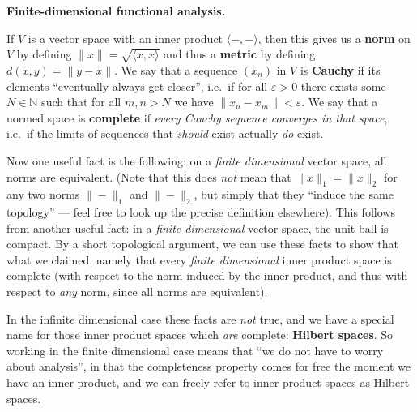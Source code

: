 \documentclass[fleqn,a4paper]{article}
\newenvironment{technical}[1]{\textbf{#1.}\par\vspace{.5\baselineskip}\everypar{\setlength{\parindent}{1.5em}}}{}
\theoremstyle{definition}
\theoremstyle{definition}
\theoremstyle{definition}
\theoremstyle{definition}
\theoremstyle{remark}
\begin{document}
\begin{technical}{Finite-dimensional functional analysis}
If \(V\) is a vector space with an inner product \(\langle-,-\rangle\), then this gives us a \textbf{norm} on \(V\) by defining \(\|x\|=\sqrt{\langle x,x\rangle}\) and thus a \textbf{metric} by defining \(d(x,y)=\|y-x\|\).
We say that a sequence \((x_n)\) in \(V\) is \textbf{Cauchy} if its elements ``eventually always get closer'', i.e.~if for all \(\varepsilon>0\) there exists some \(N\in\mathbb{N}\) such that for all \(m,n>N\) we have \(\|x_n-x_m\|<\varepsilon\).
We say that a normed space is \textbf{complete} if \emph{every Cauchy sequence converges in that space}, i.e.~if the limits of sequences that \emph{should} exist actually \emph{do} exist.

Now one useful fact is the following: on a \emph{finite dimensional} vector space, all norms are equivalent.
(Note that this does \emph{not} mean that \(\|x\|_1=\|x\|_2\) for any two norms \(\|-\|_1\) and \(\|-\|_2\), but simply that they ``induce the same topology'' --- feel free to look up the precise definition elsewhere).
This follows from another useful fact: in a \emph{finite dimensional} vector space, the unit ball is compact.
By a short topological argument, we can use these facts to show that what we claimed, namely that every \emph{finite dimensional} inner product space is complete (with respect to the norm induced by the inner product, and thus with respect to \emph{any} norm, since all norms are equivalent).

In the infinite dimensional case these facts are \emph{not} true, and we have a special name for those inner product spaces which \emph{are} complete: \textbf{Hilbert spaces}.
So working in the finite dimensional case means that ``we do not have to worry about analysis'', in that the completeness property comes for free the moment we have an inner product, and we can freely refer to inner product spaces as Hilbert spaces.

\end{technical}
\end{document}
